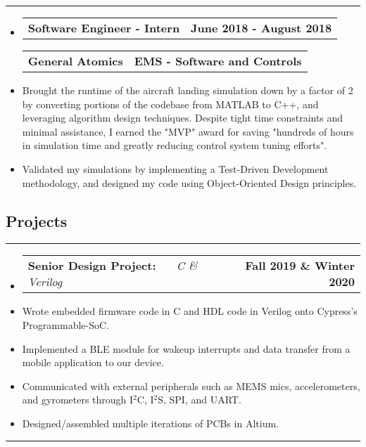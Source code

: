 \documentclass[10pt,letterpaper]{article}
\makeatletter
\newcommand{\header}[2]
{
	\begin{tabular*}{\linewidth}{l @{\extracolsep{\fill}} r}
		\hspace{-27pt} #1 & #2 \\
	\end{tabular*}
}
\newcommand{\sectionbreak}
{
	\vspace{-1.2em}
	\rule{\textwidth}{1.7pt}
	\vspace{-1.7em}
}
\makeatother
\begin{document}
\hrule

\begin{itemize}
	\item[]
		\header
			{\textbf{Software Engineer - Intern}} 
			{\textbf{June 2018 - August 2018}}
		\header
			{\textbf{General Atomics}}
			{\textbf{EMS - Software and Controls}} 
		\item
			Brought the runtime of the aircraft landing simulation down by a factor of 2 by converting portions of the codebase
			from MATLAB to C++, and leveraging algorithm design techniques. Despite tight time constraints and minimal assistance,
			I earned the "MVP" award for saving "hundreds of hours in simulation time and greatly reducing control system tuning efforts".
		\item
			Validated my simulations by implementing a Test-Driven Development methodology, and designed my code using Object-Oriented Design principles.


\end{itemize}

\vspace{-1.5em}

\subsection*{Projects}
\sectionbreak


\begin{itemize}
	\item[]
		\header
		{
			\textbf{Senior Design Project: }
			\emph{\smash{Smart Dog Collar}} \ \ \ \footnotesize \emph{C \& Verilog}
		}
			{\textbf{Fall 2019 \& Winter 2020}}
		\item 
			Wrote embedded firmware code in C and HDL code in Verilog onto Cypress's Programmable-SoC. 
		\item 
			Implemented a BLE module for wakeup interrupts and data transfer from a mobile application to our device. 
		\item 
			Communicated with external peripherals such as MEMS mics, accelerometers, and gyrometers through I$^{2}$C, I$^{2}$S, SPI, and UART. 
		\item 
			Designed/assembled multiple iterations of PCBs in Altium.

\end{itemize}

\hrule
\end{document}
